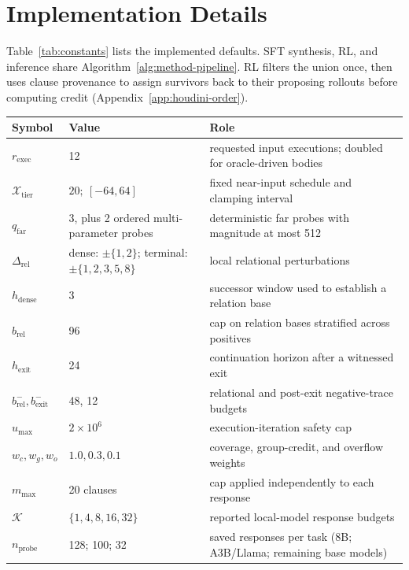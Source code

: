 \section{Implementation Details}
\label{app:constants}

Table~\ref{tab:constants} lists the implemented defaults.  SFT synthesis,
RL, and inference share Algorithm~\ref{alg:method-pipeline}.  RL filters the
union once, then uses clause provenance to assign survivors back to their
proposing rollouts before computing credit
(Appendix~\ref{app:houdini-order}).

\begin{table}[H]
\centering
\begin{tabular}{p{2.6cm}p{3.1cm}p{5.9cm}}
\toprule
\rowcolor{algobg}
\textbf{Symbol} & \textbf{Value} & \textbf{Role} \\
\midrule
\(r_{\mathrm{exec}}\) & 12 & requested input executions; doubled for oracle-driven bodies \\
\(\mathcal X_{\mathrm{tier}}\) & \(20;\ [-64,64]\) & fixed near-input schedule and clamping interval \\
\(q_{\mathrm{far}}\) & 3, plus 2 ordered multi-parameter probes & deterministic far probes with magnitude at most 512 \\
\(\Delta_{\mathrm{rel}}\) & dense: \(\pm\{1,2\}\); terminal: \(\pm\{1,2,3,5,8\}\) & local relational perturbations \\
\(h_{\mathrm{dense}}\) & 3 & successor window used to establish a relation base \\
\(b_{\mathrm{rel}}\) & 96 & cap on relation bases stratified across positives \\
\(h_{\mathrm{exit}}\) & 24 & continuation horizon after a witnessed exit \\
\(b^-_{\mathrm{rel}},b^-_{\mathrm{exit}}\) & 48, 12 & relational and post-exit negative-trace budgets \\
\(u_{\max}\) & \(2\times10^6\) & execution-iteration safety cap \\
\midrule
\(w_c,w_g,w_o\) & \(1.0,0.3,0.1\) & coverage, group-credit, and overflow weights \\
\(m_{\max}\) & 20 clauses & cap applied independently to each response \\
\(\mathcal K\) & \(\{1,4,8,16,32\}\) & reported local-model response budgets \\
\(n_{\mathrm{probe}}\) & 128; 100; 32 & saved responses per task (8B; A3B/Llama; remaining base models) \\

\end{tabular}
\end{table}
